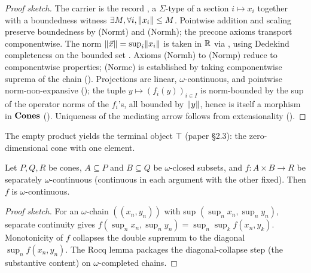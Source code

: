 \begin{proof}[Proof sketch]
The carrier is the record
, a $\Sigma$-type of a
section $i \mapsto x_i$ together with a boundedness witness
$\exists M, \forall i, \lVert x_i \rVert \leq M$. Pointwise addition and
scaling preserve boundedness by (Normt) and (Normh); the precone
axioms transport componentwise. The norm
$\lVert \vec{x} \rVert = \sup_i \lVert x_i \rVert$ is taken in $\mathbb{R}$ via
, using Dedekind
completeness on the bounded set
. Axioms (Normh)
to (Normp) reduce to componentwise properties; (Normc) is
established by taking componentwise suprema of the chain
(). Projections
are linear, $\omega$-continuous, and pointwise norm-non-expansive
(); the tuple
$y \mapsto (f_i(y))_{i \in I}$ is norm-bounded by the sup of the
operator norms of the $f_i$'s, all bounded by $\lVert y \rVert$, hence is
itself a morphism in $\mathbf{Cones}$
(). Uniqueness of the
mediating arrow follows from extensionality
().
\end{proof}

\begin{remark}
The empty product yields the terminal object $\top$ (paper
\S2.3): the zero-dimensional cone with one element.
\end{remark}

\begin{lemma}
\label{lem:separate-implies-joint}
\rocqok{}
Let $P, Q, R$ be cones, $A \subseteq P$ and $B \subseteq Q$ be
$\omega$-closed subsets, and $f : A \times B \to R$ be separately
$\omega$-continuous (continuous in each argument with the other
fixed). Then $f$ is $\omega$-continuous.
\end{lemma}

\begin{proof}[Proof sketch]
For an $\omega$-chain $((x_n, y_n))$ with sup $(\sup_n x_n, \sup_n y_n)$,
separate continuity gives $f(\sup_n x_n, \sup_n y_n) = \sup_n \sup_k
f(x_n, y_k)$. Monotonicity of $f$ collapses the double supremum to
the diagonal $\sup_n f(x_n, y_n)$. The Rocq lemma
 packages the
diagonal-collapse step (the substantive content) on
$\omega$-completed chains.
\end{proof}

